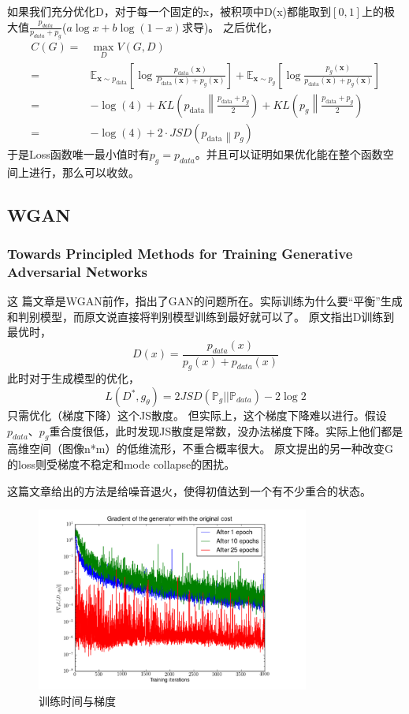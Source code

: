 \documentclass[a4paper]{article}
\begin{document}
如果我们充分优化D，对于每一个固定的x，被积项中D(x)都能取到$[0,1]$上的极大值$\frac{p_{data}}{p_{data} + p_g}$($a\log x+b \log (1-x)$求导)。
之后优化，\begin{align}
\label{eq:G-criterion}
 C(G) =& \max_D V(G,D) \nonumber \\
      =& \mathbb{E}_{\bm{x} \sim p_\text{data}}\left[\log \frac{p_\text{data}(\bm{x})}{P_\text{data}(\bm{x}) + p_g(\bm{x})}\right] + 
         \mathbb{E}_{\bm{x} \sim p_g}\left[\log \frac{p_g(\bm{x})}{p_\text{data}(\bm{x}) + p_g(\bm{x})}\right] \nonumber \\
      =& -\log(4) + KL \left(p_\text{data} \left \| \frac{p_\text{data} + p_g}{2} \right. \right) + KL \left(p_g \left \| \frac{p_\text{data} + p_g}{2} \right. \right) \nonumber \\
      =& - \log(4) + 2 \cdot JSD \left(p_\text{data} \left \| p_g \right. \right)\nonumber
\end{align}
于是Loss函数唯一最小值时有$p_g = p_{data}$。并且可以证明如果优化能在整个函数空间上进行，那么可以收敛。

\subsection{WGAN}
\subsubsection{Towards Principled Methods for Training Generative Adversarial Networks\cite{DBLP:journals/corr/ArjovskyB17}}
这
篇文章是WGAN前作，指出了GAN的问题所在。实际训练为什么要“平衡”生成和判别模型，而原文说直接将判别模型训练到最好就可以了。
原文指出D训练到最优时，$$D(x) = \frac{p_{data}(x)}{p_g(x) + p_{data}(x)}$$
此时对于生成模型的优化，$$L(D^*,g_\theta)=2JSD(\mathbb{P}_g||\mathbb{P}_{data})-2\log 2$$只需优化（梯度下降）这个JS散度。
但实际上，这个梯度下降难以进行。假设$p_{data}、p_{g}$重合度很低，此时发现JS散度是常数，没办法梯度下降。实际上他们都是高维空间（图像n*m）的低维流形，不重合概率很大。
原文提出的另一种改变G的loss则受梯度不稳定和mode collapse的困扰。

这篇文章给出的方法是给噪音退火，使得初值达到一个有不少重合的状态。
\begin{figure}
\centering
\includegraphics[width=0.8\textwidth]{./img/4.png}
\caption{训练时间与梯度}
\label{fig:4}
\end{figure}
\end{document}
